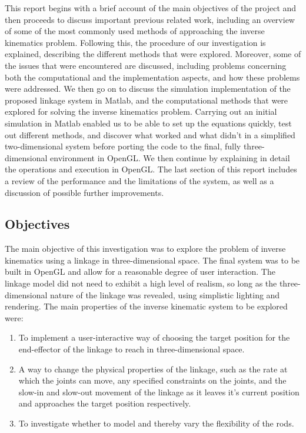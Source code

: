 \documentclass[paper=a4, fontsize=11pt]{scrartcl} %
\numberwithin{equation}{section} %
\numberwithin{figure}{section} %
\numberwithin{table}{section} %
\begin{document}
This report begins with a brief account of the main objectives of the project and then proceeds to discuss important previous related work, including an overview of some of the most commonly used methods of approaching the inverse kinematics problem. Following this, the procedure of our investigation is explained, describing the different methods that were explored. Moreover, some of the issues that were encountered are discussed, including problems concerning both the computational and the implementation aspects, and how these problems were addressed. We then go on to discuss the simulation implementation of the proposed linkage system in Matlab, and the computational methods that were explored for solving the inverse kinematics problem. Carrying out an initial simulation in Matlab enabled us to be able to set up the equations quickly, test out different methods, and discover what worked and what didn't in a simplified two-dimensional system before porting the code to the final, fully three-dimensional environment in OpenGL. We then continue by explaining in detail the operations and execution in OpenGL. The last section of this report includes a review of the performance and the limitations of the system, as well as a discussion of possible further improvements.

\subsection{Objectives}

The main objective of this investigation was to explore the problem of inverse kinematics using a linkage in three-dimensional space. The final system was to be built in OpenGL and allow for a reasonable degree of user interaction. The linkage model did not need to exhibit a high level of realism, so long as the three-dimensional nature of the linkage was revealed, using simplistic lighting and rendering. The main properties of the inverse kinematic system to be explored were:

\begin{enumerate}
\item
To implement a user-interactive way of choosing the target position for the end-effector of the linkage to reach in three-dimensional space.

\item
A way to change the physical properties of the linkage, such as the rate at which the joints can move, any specified constraints on the joints, and the slow-in and slow-out movement of the linkage as it leaves it's current position and approaches the target position respectively.

\item
To investigate whether to model and thereby vary the flexibility of the rods.
\end{enumerate} 
\end{document}
